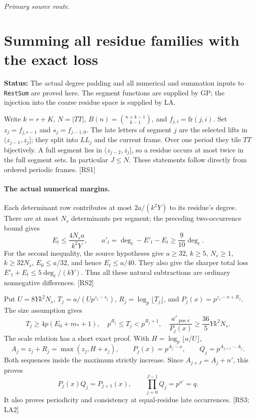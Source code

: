 \documentclass[11pt,a4paper]{article}
\numberwithin{equation}{section}
\theoremstyle{remark}\newtheorem{remark}[theorem]{Remark}
\newcommand{\status}[1]{\textbf{Status:} #1}
\begin{document}
\noindent\textit{Primary source route.}\cite{good-paths}

\section{Summing all residue families with the exact loss}\label{sec:residue-summation}

\status{The actual degree padding and all numerical and summation inputs to
\texttt{RestSum} are proved here. The segment functions are supplied by GP;
the injection into the coarse residue space is supplied by LA.}

Write $k=r+K$, $N=|TT|$, $B(n)=\binom{n+k-1}{k-1}$, and
$f_{j,i}=\mathrm{fr}(j,i)$. Set $z_j=f_{j,r-1}$ and $s_j=f_{j-1,0}$.
The late letters of segment $j$ are the selected lifts in $(z_{j-1},z_j]$;
they split into $LL_j$ and the current frame. Over one period they tile
$TT$ bijectively. A full segment lies in $(z_{j-2},z_j]$, so a residue
occurs at most twice in the full segment sets. In particular $J\le N$.
These statements follow directly from ordered periodic frames. \textsf{[RS1]}

\paragraph{The actual numerical margins.}
Each determinant row contributes at most $2a/(k^2Y)$ to its residue's
degree. There are at most $N_s$ determinants per segment; the preceding
two-occurrence bound gives
\[
 E_t\le\frac{4N_sa}{k^2Y},\qquad
 a'_t=\deg_t-E'_t-E_t\ge\frac9{10}\deg_t.
 \tag{RS.1}
\]
For the second inequality, the source hypotheses give
$a\ge32$, $k\ge5$, $N_s\ge1$, $k\ge32N_s$, $E_0\le a/32$,
and hence $E_t\le a/40$. They also give the sharper total loss
$E'_t+E_t\le5\deg_t/(kY)$. Thus all these natural subtractions are
ordinary nonnegative differences. \textsf{[RS2]}

Put $U=8Yk^2N_s$, $T_j=a/(Up^{z_j-s_j})$,
$R_j=\log_p\lfloor T_j\rfloor$, and $P_j(x)=p^{z_j-x+R_j}$.
The size assumption gives
\[
 T_j\ge4p(E_0+m_*+1),\quad
 p^{R_j}\le T_j<p^{R_j+1},\quad
 \frac{a'_{\operatorname{pos}x}}{P_j(x)}
 \ge\frac{36}{5}Yk^2N_s. \tag{RS.2}
\]
The scale relation has a short exact proof. With
$H=\log_p\lfloor a/U\rfloor$,
\[
 A_j=z_j+R_j=\max(z_j,H+s_j),\qquad
 P_j(x)=p^{A_j-x},\qquad Q_j=p^{A_{j+1}-A_j}.
\]
Both sequences inside the maximum strictly increase. Since
$A_{j+J}=A_j+n'$, this proves
\[
 P_j(x)Q_j=P_{j+1}(x),\qquad \prod_{j=0}^{J-1}Q_j=p^{n'}=q.
 \tag{RS.3}
\]
It also proves periodicity and consistency at equal-residue late
occurrences. \textsf{[RS3; LA2]}
\end{document}
